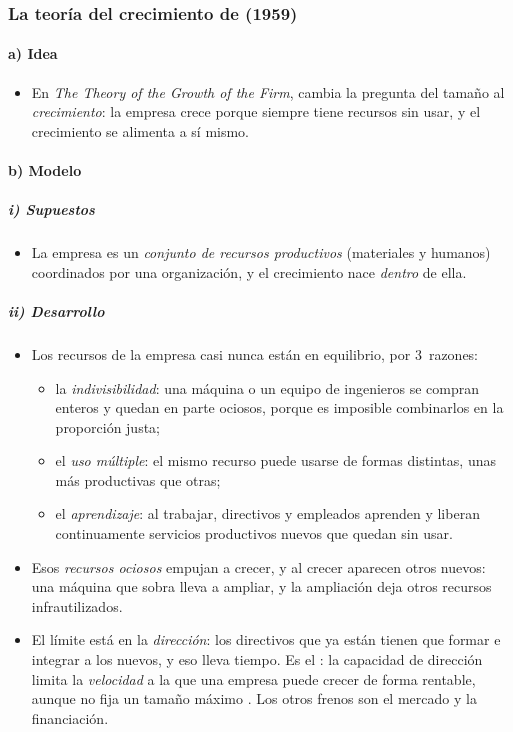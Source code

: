 \documentclass[11pt]{article}
\begin{document}
\subsubsection{La teoría del crecimiento de  (1959)}\label{sec:penrose}

\paragraph{a) Idea}

\begin{itemize}
\item En \emph{The Theory of the Growth of the Firm}, \textcite{Penrose1959Theory} cambia la pregunta del tamaño al \emph{crecimiento}: la empresa crece porque siempre tiene recursos sin usar, y el crecimiento se alimenta a sí mismo.
\end{itemize}

\paragraph{b) Modelo}

\subparagraph{i) Supuestos}

\begin{itemize}
\item La empresa es un \emph{conjunto de recursos productivos} (materiales y humanos) coordinados por una organización, y el crecimiento nace \emph{dentro} de ella.
\end{itemize}

\subparagraph{ii) Desarrollo}

\begin{itemize}
\item Los recursos de la empresa casi nunca están en equilibrio, por 3~razones:
  \begin{itemize}
  \item la \emph{indivisibilidad}: una máquina o un equipo de ingenieros se compran enteros y quedan en parte ociosos, porque es imposible combinarlos en la proporción justa;
  \item el \emph{uso múltiple}: el mismo recurso puede usarse de formas distintas, unas más productivas que otras;
  \item el \emph{aprendizaje}: al trabajar, directivos y empleados aprenden y liberan continuamente servicios productivos nuevos que quedan sin usar.
  \end{itemize}
\item Esos \emph{recursos ociosos} empujan a crecer, y al crecer aparecen otros nuevos: una máquina que sobra lleva a ampliar, y la ampliación deja otros recursos infrautilizados.
\item El límite está en la \emph{dirección}: los directivos que ya están tienen que formar e integrar a los nuevos, y eso lleva tiempo. Es el : la capacidad de dirección limita la \emph{velocidad} a la que una empresa puede crecer de forma rentable, aunque no fija un tamaño máximo . Los otros frenos son el mercado y la financiación.
\end{itemize}
\end{document}
